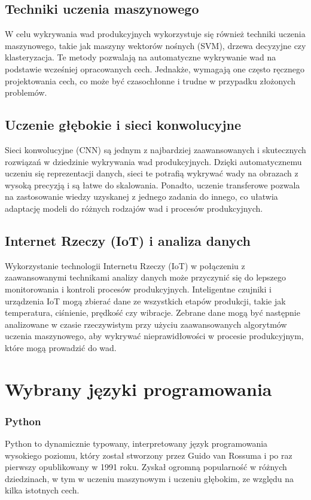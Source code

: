 \subsection{Techniki uczenia maszynowego}
W celu wykrywania wad produkcyjnych wykorzystuje się również techniki uczenia maszynowego, takie jak maszyny wektorów nośnych (SVM), drzewa decyzyjne czy klasteryzacja. Te metody pozwalają na automatyczne wykrywanie wad na podstawie wcześniej opracowanych cech. Jednakże, wymagają one często ręcznego projektowania cech, co może być czasochłonne i trudne w przypadku złożonych problemów.

\subsection{Uczenie głębokie i sieci konwolucyjne}
Sieci konwolucyjne (CNN) są jednym z najbardziej zaawansowanych i skutecznych rozwiązań w dziedzinie wykrywania wad produkcyjnych. Dzięki automatycznemu uczeniu się reprezentacji danych, sieci te potrafią wykrywać wady na obrazach z wysoką precyzją i są łatwe do skalowania. Ponadto, uczenie transferowe pozwala na zastosowanie wiedzy uzyskanej z jednego zadania do innego, co ułatwia adaptację modeli do różnych rodzajów wad i procesów produkcyjnych.

\subsection{Internet Rzeczy (IoT) i analiza danych}
Wykorzystanie technologii Internetu Rzeczy (IoT) w połączeniu z zaawansowanymi technikami analizy danych może przyczynić się do lepszego monitorowania i kontroli procesów produkcyjnych. Inteligentne czujniki i urządzenia IoT mogą zbierać dane ze wszystkich etapów produkcji, takie jak temperatura, ciśnienie, prędkość czy wibracje. Zebrane dane mogą być następnie analizowane w czasie rzeczywistym przy użyciu zaawansowanych algorytmów uczenia maszynowego, aby wykrywać nieprawidłowości w procesie produkcyjnym, które mogą prowadzić do wad.

\section{Wybrany języki programowania}

\subsubsection{Python}
Python to dynamicznie typowany, interpretowany język programowania wysokiego poziomu, który został stworzony przez Guido van Rossuma i po raz pierwszy opublikowany w 1991 roku. Zyskał ogromną popularność w różnych dziedzinach, w tym w uczeniu maszynowym i uczeniu głębokim, ze względu na kilka istotnych cech.

